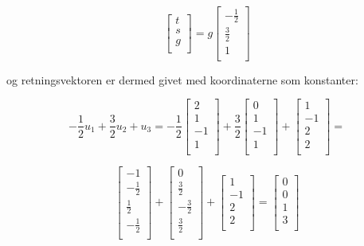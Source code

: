 \documentclass[a4paper,12pt]{article}
\begin{document}
\[
\left[\begin{array}{cc}
    t\\
    s\\
    g\\
\end{array}\right]
=
g
\left[\begin{array}{cc}
    -\frac{1}{2}\\
    \frac{3}{2}\\
    1\\
\end{array}\right]
\]

og retningsvektoren er dermed givet med koordinaterne som konstanter:

\[
-\frac{1}{2}u_1 + \frac{3}{2}u_2 + u_3 = 
-\frac{1}{2}
\left[\begin{array}{cc}
    2\\
    1\\
    -1\\
    1\\
\end{array}\right]
+
\frac{3}{2}
\left[\begin{array}{cc}
    0\\
    1\\
    -1\\
    1\\
\end{array}\right]
+
\left[\begin{array}{cc}
    1\\
    -1\\
    2\\
    2\\
\end{array}\right]
=
\]

\[
\left[\begin{array}{cc}
    -1\\
    -\frac{1}{2}\\
    \frac{1}{2}\\
    -\frac{1}{2}\\
\end{array}\right]
+
\left[\begin{array}{cc}
    0\\
    \frac{3}{2}\\
    -\frac{3}{2}\\
    \frac{3}{2}\\
\end{array}\right]
+
\left[\begin{array}{cc}
    1\\
    -1\\
    2\\
    2\\
\end{array}\right]
=
\left[\begin{array}{cc}
    0\\
    0\\
    1\\
    3\\
\end{array}\right]
\]
\end{document}
